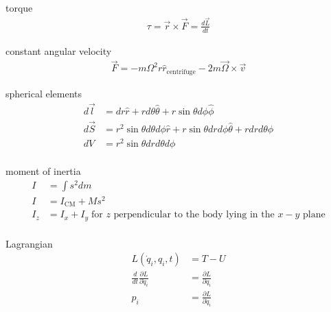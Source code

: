 \documentclass[avery5388, frame, grid]{flashcards}
\begin{document}
\begin{flashcard}{torque}
  {
    \begin{align*}
      \tau = \vec{r} \times \vec{F} = \frac{d \vec{L}}{dt}
    \end{align*}
  }
\end{flashcard}

\begin{flashcard}{constant angular velocity}
  {
    \begin{align*}
      \vec{F} = - m \Omega^{2} r \hat{r}_{\textrm{centrifuge}} - 2 m \vec{\Omega} \times \vec{v}
    \end{align*}
  }
\end{flashcard}

\begin{flashcard}{spherical elements}
  {
    \begin{align*}
      d\vec{l} &= dr \hat{r} + r d\theta \hat{\theta} + r \sin\theta d\phi \hat{\phi}\\
      d\vec{S} &= r^{2}\sin\theta d\theta d\phi \hat{r} + r \sin\theta dr d\phi \hat{\theta} + r dr d\theta \hat{\phi}\\
      dV &= r^{2}\sin\theta dr d\theta d\phi\\
    \end{align*}
  }
\end{flashcard}

\begin{flashcard}{moment of inertia}
  {
    \begin{align*}
      I &= \int{s^{2} dm}\\
      I &= I_{\textrm{CM}} + M s^{2}\\
      I_{z} &= I_{x} + I_{y} \; \textrm{for $z$ perpendicular to the body lying in the $x-y$ plane}\\
    \end{align*}
  }
\end{flashcard}

\begin{flashcard}{Lagrangian}
  {
    \begin{align*}
        L(\dot{q}_{i}, q_{i}, t) &= T - U\\
        \frac{d}{dt} \frac{\partial L}{\partial \dot{q}_{i}} &= \frac{\partial L}{\partial q_{i}}\\
        p_{i} &= \frac{\partial L}{\partial \dot{q}_{i}}\\
    \end{align*}
  }
\end{flashcard}
\end{document}
